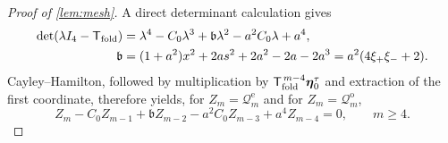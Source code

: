 \documentclass[review,hidelinks,onefignum,onetabnum]{siamart251216}
\begin{document}
\begin{proof}[Proof of \cref{lem:mesh}]
A direct determinant calculation gives
\begin{equation}\label{eq:fold-transfer-characteristic}
\begin{aligned}
 \det(\lambda I_4-\mathsf T_{\rm fold})
 &=
 \lambda^4-C_0\lambda^3+\mathfrak b\lambda^2
 -a^2C_0\lambda+a^4,\\
 \mathfrak b
 &=(1+a^2)x^2+2as^2+2a^2-2a-2a^3
 =a^2(4\xi_+\xi_-+2).
\end{aligned}
\end{equation}
Cayley--Hamilton, followed by multiplication by
\(\mathsf T_{\rm fold}^{\,m-4}\boldsymbol\eta_0^\tau\) and extraction
of the first coordinate, therefore yields, for
\(Z_m=\mathcal Q_m^{\mathrm e}\) and for
\(Z_m=\mathcal Q_m^{\mathrm o}\),
\begin{equation}\label{eq:fold-recurrence}
 Z_m-C_0Z_{m-1}+\mathfrak bZ_{m-2}
 -a^2C_0Z_{m-3}+a^4Z_{m-4}=0,
 \qquad m\geq4.
\end{equation}


\end{proof}
\end{document}
